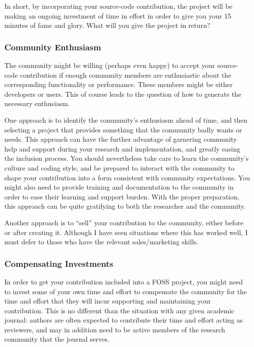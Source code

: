 In short, by incorporating your source-code contribution, the
project will be making an ongoing investment of time in effort
in order to give you your 15 minutes of fame and glory.
What will you give the project in return?

\subsubsection{Community Enthusiasm}
\label{sec:app:rcuhist:Community Enthusiasm}

The community might be willing (perhaps even happy) to accept your
source-code contribution if enough community members are enthusiastic about
the corresponding functionality or performance.
These members might be either developers or users.
This of course leads to the question of how to generate the
necessary enthusiasm.

One approach is to identify the community's enthusiasm
ahead of time, and then selecting a project that provides something that
the community badly wants or needs.
This approach can have the further advantage of garnering community
help and support during your research and implementation, and greatly
easing the inclusion process.
You should nevertheless take care to learn the community's culture and
coding style, and be prepared to interact with the community to shape
your contribution into a form consistent with community expectations.
You might also need to provide training and documentation to the
community in order to ease their learning and support burden.
With the proper preparation, this approach can be quite gratifying
to both the researcher and the community.

Another approach is to ``sell'' your contribution to the community,
either before or after creating it.
Although I have seen situations where this has worked well, I must
defer to those who have the relevant sales/marketing skills.

\subsubsection{Compensating Investments}
\label{sec:app:rcuhist:Compensating Investments}

In order to get your contribution included into a FOSS project, you might
need to invest some of your own time and effort to compensate the
community for the time and effort that they will incur supporting
and maintaining your contribution.
This is no different than the situation with any given academic journal:
authors are often expected to contribute their time and effort
acting as reviewers, and may in addition
need to be active members of the research community that the journal
serves.

